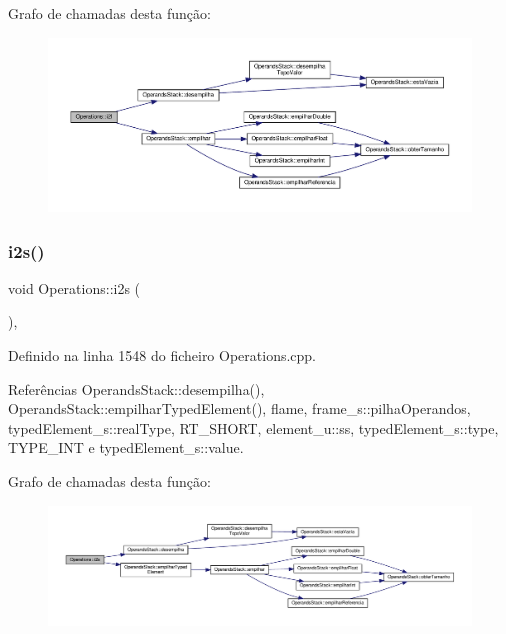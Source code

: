 Grafo de chamadas desta função\+:
\nopagebreak
\begin{figure}[H]
\begin{center}
\leavevmode
\includegraphics[width=350pt]{classOperations_ae5d28665a74411cbb880e3007c5405e8_cgraph}
\end{center}
\end{figure}
\mbox{\label{classOperations_ab83ebb06495a6e42c5edeec05e312f8c}} 
\subsubsection{\texorpdfstring{i2s()}{i2s()}}
{\footnotesize\ttfamily void Operations\+::i2s (\begin{DoxyParamCaption}{ }\end{DoxyParamCaption})\hspace{0.3cm}{\ttfamily [static]}, {\ttfamily [private]}}



Definido na linha 1548 do ficheiro Operations.\+cpp.



Referências Operands\+Stack\+::desempilha(), Operands\+Stack\+::empilhar\+Typed\+Element(), flame, frame\+\_\+s\+::pilha\+Operandos, typed\+Element\+\_\+s\+::real\+Type, R\+T\+\_\+\+S\+H\+O\+RT, element\+\_\+u\+::ss, typed\+Element\+\_\+s\+::type, T\+Y\+P\+E\+\_\+\+I\+NT e typed\+Element\+\_\+s\+::value.

Grafo de chamadas desta função\+:
\nopagebreak
\begin{figure}[H]
\begin{center}
\leavevmode
\includegraphics[width=350pt]{classOperations_ab83ebb06495a6e42c5edeec05e312f8c_cgraph}
\end{center}
\end{figure}
\mbox{\label{classOperations_a12d5933f0d0c91c578b76edb1971a2be}} 
